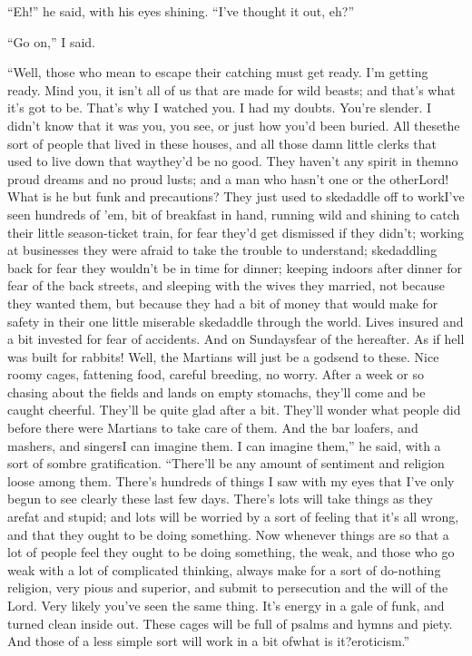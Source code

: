 ``Eh!'' he said, with his eyes shining. ``I've thought it out, eh?''

``Go on,'' I said.

``Well, those who mean to escape their catching must get ready. I'm
getting ready. Mind you, it isn't all of us that are made for wild
beasts; and that's what it's got to be. That's why I watched you. I
had my doubts. You're slender. I didn't know that it was you, you
see, or just how you'd been buried. All these\dash{}the sort of people
that lived in these houses, and all those damn little clerks that
used to live down that way\dash{}they'd be no good. They haven't any
spirit in them\dash{}no proud dreams and no proud lusts; and a man who
hasn't one or the other\dash{}Lord! What is he but funk and precautions?
They just used to skedaddle off to work\dash{}I've seen hundreds of 'em,
bit of breakfast in hand, running wild and shining to catch their
little season-ticket train, for fear they'd get dismissed if they
didn't; working at businesses they were afraid to take the trouble
to understand; skedaddling back for fear they wouldn't be in time
for dinner; keeping indoors after dinner for fear of the back
streets, and sleeping with the wives they married, not because they
wanted them, but because they had a bit of money that would make
for safety in their one little miserable skedaddle through the
world. Lives insured and a bit invested for fear of accidents. And
on Sundays\dash{}fear of the hereafter. As if hell was built for
rabbits! Well, the Martians will just be a godsend to these. Nice
roomy cages, fattening food, careful breeding, no worry. After a
week or so chasing about the fields and lands on empty stomachs,
they'll come and be caught cheerful. They'll be quite glad after a
bit. They'll wonder what people did before there were Martians to
take care of them. And the bar loafers, and mashers, and singers\dash{}I
can imagine them. I can imagine them,'' he said, with a sort of
sombre gratification. ``There'll be any amount of sentiment and
religion loose among them. There's hundreds of things I saw with my
eyes that I've only begun to see clearly these last few days.
There's lots will take things as they are\dash{}fat and stupid; and lots
will be worried by a sort of feeling that it's all wrong, and that
they ought to be doing something. Now whenever things are so that a
lot of people feel they ought to be doing something, the weak, and
those who go weak with a lot of complicated thinking, always make
for a sort of do-nothing religion, very pious and superior, and
submit to persecution and the will of the Lord. Very likely you've
seen the same thing. It's energy in a gale of funk, and turned
clean inside out. These cages will be full of psalms and hymns and
piety. And those of a less simple sort will work in a bit of\dash{}what
is it?\dash{}eroticism.''

